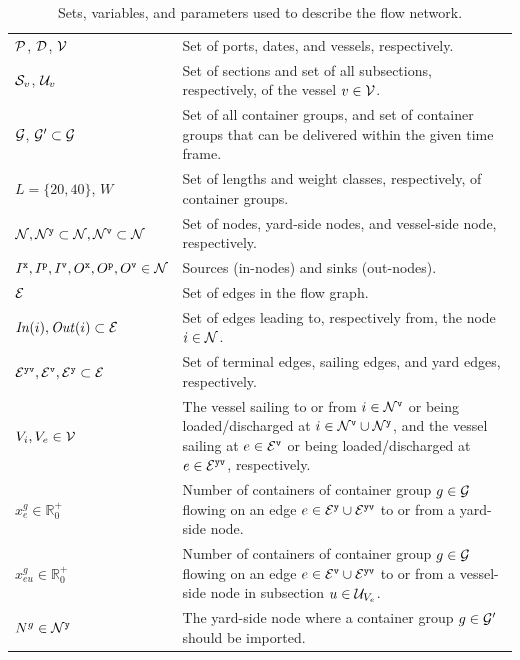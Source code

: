 \begin{table}[width=.9\linewidth,cols=2,pos=htbp]%
\caption{Sets, variables, and parameters used to describe the flow network.}\label{tab:net}
\begin{tabular*}{\tblwidth}{@{} Lp{10.8cm} @{}}
\toprule
$\mathcal{P}$, $\mathcal{D}$, $\mathcal{V}$		& Set of ports, dates, and vessels, respectively.\\
$\mathcal{S}_v$, $\mathcal{U}_v$				& Set of sections and set of all subsections, respectively, of the vessel $v\in\mathcal{V}$.\\ 
$\mathcal{G}$, $\mathcal{G}'\subset \mathcal{G}$	& Set of all container groups, and set of container groups that can be delivered within the given time frame.\\
$L=\{20,40\}$, $W$					& Set of lengths and weight classes, respectively, of container groups.\\
$\mathcal{N}, \mathcal{N}^\texttt{y}\subset \mathcal{N}, \mathcal{N}^\texttt{v}\subset \mathcal{N}$
									& Set of nodes, yard-side nodes, and vessel-side node, respectively. \\
$I^\texttt{x},I^\texttt{p},I^\texttt{v}, O^\texttt{x}, O^\texttt{p},O^\texttt{v}\in\mathcal{N}$
									& Sources (in-nodes) and sinks (out-nodes). \\
$\mathcal{E}$							& Set of edges in the flow graph.\\
$\mathit{In}(i),\mathit{Out}(i)\subset \mathcal{E}$	
									& Set of edges leading to, respectively from, the node $i\in\mathcal{N}$.\\
$\mathcal{E}^\texttt{yv}, \mathcal{E}^\texttt{v}, \mathcal{E}^\texttt{y}\subset\mathcal{E}$
									& Set of terminal edges, sailing edges, and yard edges, respectively.\\
$V_i, V_e\in\mathcal{V}$					& The vessel sailing to or from $i\in \mathcal{N}^\texttt{v}$ or being loaded/discharged at $i\in\mathcal{N}^\texttt{v}\cup\mathcal{N}^\texttt{y}$, and the vessel sailing at $e\in\mathcal{E}^\texttt{v}$ or being loaded/discharged at $e\in\mathcal{E}^\texttt{yv}$, respectively.\\ 
\midrule
$x^g_e\in\mathbb{R}^+_0$			& Number of containers of container group $g\in \mathcal{G}$ flowing on an edge $e\in \mathcal{E}^\texttt{y}\cup\mathcal{E}^\texttt{yv}$ to or from a yard-side node.\\
$x^{g}_{eu}\in\mathbb{R}^+_0$		& Number of containers of container group $g\in\mathcal{G}$ flowing on an edge $e\in\mathcal{E}^\texttt{v}\cup\mathcal{E}^\texttt{yv}$ to or from a vessel-side node in subsection $u\in \mathcal{U}_{V_e}$.\\
\midrule
$N^g\in\mathcal{N}^\texttt{y}$		 		& The yard-side node where a container group $g\in \mathcal{G}'$ should be imported.\\

\end{tabular*}
\end{table}
